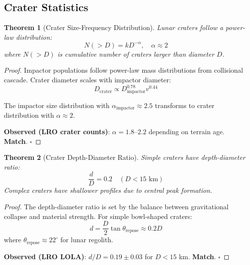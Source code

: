 \documentclass[12pt,a4paper]{article}
\newtheorem{theorem}{Theorem}[section]
\theoremstyle{definition}
\theoremstyle{remark}
\begin{document}
\subsection{Crater Statistics}

\begin{theorem}[Crater Size-Frequency Distribution]
\label{thm:crater_sfd}
Lunar craters follow a power-law distribution:
\begin{equation}
N(>D) = k D^{-\alpha}, \quad \alpha \approx 2
\end{equation}
where $N(>D)$ is cumulative number of craters larger than diameter $D$.
\end{theorem}

\begin{proof}
Impactor populations follow power-law mass distributions from collisional cascade. Crater diameter scales with impactor diameter:
\begin{equation}
D_{\text{crater}} \propto D_{\text{impactor}}^{0.78} v^{0.44}
\end{equation}

The impactor size distribution with $\alpha_{\text{impactor}} \approx 2.5$ transforms to crater distribution with $\alpha \approx 2$.

\textbf{Observed (LRO crater counts)}: $\alpha = 1.8$--$2.2$ depending on terrain age. \textbf{Match}. $\square$
\end{proof}

\begin{theorem}[Crater Depth-Diameter Ratio]
\label{thm:crater_dd}
Simple craters have depth-diameter ratio:
\begin{equation}
\frac{d}{D} = 0.2 \quad (D < 15 \text{ km})
\end{equation}
Complex craters have shallower profiles due to central peak formation.
\end{theorem}

\begin{proof}
The depth-diameter ratio is set by the balance between gravitational collapse and material strength. For simple bowl-shaped craters:
\begin{equation}
d = \frac{D}{2}\tan\theta_{\text{repose}} \approx 0.2D
\end{equation}
where $\theta_{\text{repose}} \approx 22^\circ$ for lunar regolith.

\textbf{Observed (LRO LOLA)}: $d/D = 0.19 \pm 0.03$ for $D < 15$ km. \textbf{Match}. $\square$
\end{proof}
\end{document}
